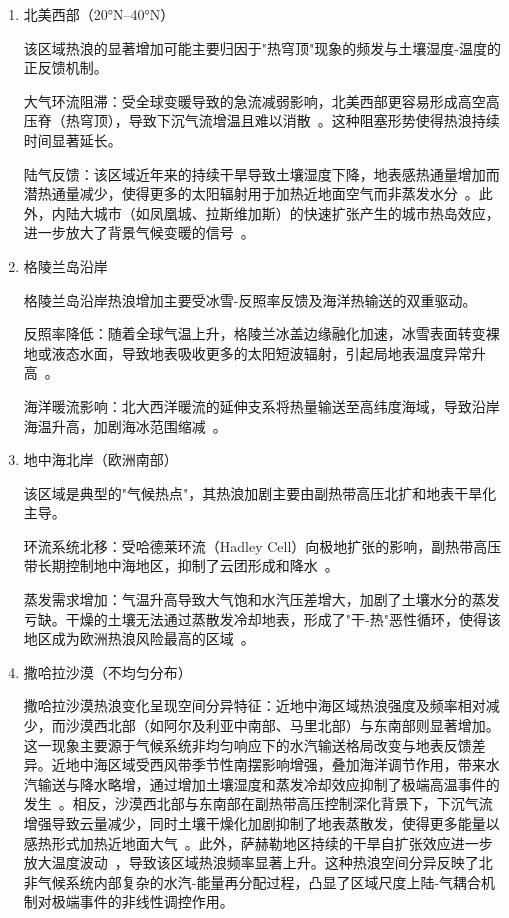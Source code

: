 \documentclass[a4paper,UTF8,scheme=chinese,zihao=-4,twoside]{ctexart}
\makeatletter
\newcommand{\初号}{\zihao{0}}
\newcommand{\小初}{\zihao{-0}}
\newcommand{\一号}{\zihao{1}}
\newcommand{\小一}{\zihao{-1}}
\newcommand{\二号}{\zihao{2}}
\newcommand{\小二}{\zihao{-2}}
\newcommand{\三号}{\zihao{3}}
\newcommand{\小三}{\zihao{-3}}
\newcommand{\四号}{\zihao{4}}
\newcommand{\小四}{\zihao{-4}}
\newcommand{\五号}{\zihao{5}}
\newcommand{\小五}{\zihao{-5}}
\newcommand{\六号}{\zihao{6}}
\newcommand{\小六}{\zihao{-6}}
\newcommand{\七号}{\zihao{7}}
\newcommand{\八号}{\zihao{8}}
\newcommand{\宋体}{\songti}
\newcommand{\黑体}{\heiti}
\newcommand{\仿宋}{\fangsong}
\newcommand{\楷书}{\kaishu}
\newcommand{\粗体}{\bfseries}
\newcommand{\斜体}{\itshape}
\newcommand\下划线[2][6em]{\hskip1pt\underline{\hb@xt@ #1{\hss#2\hss}}\hskip3pt}
\makeatother
\begin{document}
\begin{enumerate}
    \item 北美西部（20°N–40°N）

        该区域热浪的显著增加可能主要归因于"热穹顶"现象的频发与土壤湿度-温度的正反馈机制。

        大气环流阻滞：受全球变暖导致的急流减弱影响，北美西部更容易形成高空高压脊（热穹顶），导致下沉气流增温且难以消散~\cite{ipcc2021zh}。这种阻塞形势使得热浪持续时间显著延长。

        陆气反馈：该区域近年来的持续干旱导致土壤湿度下降，地表感热通量增加而潜热通量减少，使得更多的太阳辐射用于加热近地面空气而非蒸发水分~\cite{seneviratne2013}。此外，内陆大城市（如凤凰城、拉斯维加斯）的快速扩张产生的城市热岛效应，进一步放大了背景气候变暖的信号~\cite{zhao2018}。

    \item 格陵兰岛沿岸

        格陵兰岛沿岸热浪增加主要受冰雪-反照率反馈及海洋热输送的双重驱动。

        反照率降低：随着全球气温上升，格陵兰冰盖边缘融化加速，冰雪表面转变裸地或液态水面，导致地表吸收更多的太阳短波辐射，引起局地表温度异常升高~\cite{box2019}。

        海洋暖流影响：北大西洋暖流的延伸支系将热量输送至高纬度海域，导致沿岸海温升高，加剧海冰范围缩减~\cite{chen2015}。

    \item 地中海北岸（欧洲南部）

        该区域是典型的"气候热点"，其热浪加剧主要由副热带高压北扩和地表干旱化主导。

        环流系统北移：受哈德莱环流（Hadley Cell）向极地扩张的影响，副热带高压带长期控制地中海地区，抑制了云团形成和降水~\cite{lionello2012}。

        蒸发需求增加：气温升高导致大气饱和水汽压差增大，加剧了土壤水分的蒸发亏缺。干燥的土壤无法通过蒸散发冷却地表，形成了"干-热"恶性循环，使得该地区成为欧洲热浪风险最高的区域~\cite{zittis2016}。

    \item 撒哈拉沙漠（不均匀分布）

        撒哈拉沙漠热浪变化呈现空间分异特征：近地中海区域热浪强度及频率相对减少，而沙漠西北部（如阿尔及利亚中南部、马里北部）与东南部则显著增加。这一现象主要源于气候系统非均匀响应下的水汽输送格局改变与地表反馈差异。近地中海区域受西风带季节性南摆影响增强，叠加海洋调节作用，带来水汽输送与降水略增，通过增加土壤湿度和蒸发冷却效应抑制了极端高温事件的发生~\cite{zittis2014}。相反，沙漠西北部与东南部在副热带高压控制深化背景下，下沉气流增强导致云量减少，同时土壤干燥化加剧抑制了地表蒸散发，使得更多能量以感热形式加热近地面大气~\cite{almazroui2014}。此外，萨赫勒地区持续的干旱自扩张效应进一步放大温度波动~\cite{vogel2017}，导致该区域热浪频率显著上升。这种热浪空间分异反映了北非气候系统内部复杂的水汽-能量再分配过程，凸显了区域尺度上陆-气耦合机制对极端事件的非线性调控作用。


\end{enumerate}
\end{document}
